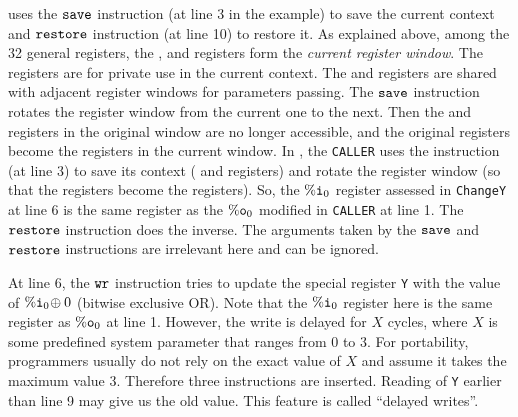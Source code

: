 \sparc{} uses the $\texttt{save}$ instruction (at line 3 in the example)
to save the current context
and $\texttt{restore}$ instruction (at line 10) to restore it.
As explained above, among the 32 general registers,
the \outRN{}, \localRN{} and \inRN{} registers form the
{\em current register window}.
The \localRN{} registers are for private use in the current context.
The \inRN{} and \outRN{} registers are shared with adjacent register windows
for parameters passing.
The $\texttt{save}$ instruction rotates the register window from the
current one to the next. Then the \localRN{} and \inRN{}
registers in the original window are no longer accessible,
and the original \outRN{} registers become the \inRN{} registers
in the current window.
In \Fig{\ref{fig:An Example for SPARC Code}},
the \texttt{CALLER} uses the \csave{} instruction 
(at line 3) to save its context
(\localRN{} and \inRN{} registers) and rotate the
register window (so that the 
\outRN{} registers become the \inRN{} registers).
So, the $\%\texttt{i}_{0}$ register
assessed in \texttt{ChangeY} at line 6 is
the same register as the $\%\texttt{o}_{0}$ modified in
\texttt{CALLER} at line 1.
The $\texttt{restore}$ instruction does the inverse.
The arguments taken by the $\texttt{save}$ and  $\texttt{restore}$ instructions
are irrelevant here and can be ignored.


At line 6, the $\texttt{wr}$ instruction tries to
update the special register {\tt Y}
with the value of $\%\texttt{i}_{0} \! \oplus 0$
(bitwise exclusive OR).
Note that the $\%\texttt{i}_{0}$
register here is the same register as $\%\texttt{o}_{0}$ at line 1.
However, the write is delayed for $X$ cycles,
where $X$ is some predefined system parameter
that ranges from 0 to 3.
For portability, programmers usually do not rely
on the exact value of $X$ and assume it takes
the maximum value 3.
Therefore three \nop{} instructions
are inserted.
Reading of {\tt Y} earlier than line 9
may give us the old value.
This feature is called ``delayed writes''.

